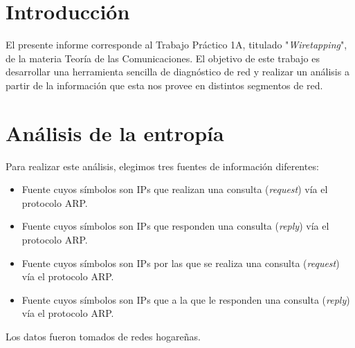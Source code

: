 \documentclass{article}
\begin{document}





\maketitle


\tableofcontents

\newpage

\section{Introducción}
El presente informe corresponde al Trabajo Práctico 1A, titulado
"\emph{Wiretapping}", de la materia Teoría de las Comunicaciones. El objetivo
de este trabajo es desarrollar una herramienta sencilla de diagnóstico de red
y realizar un análisis a partir de la información que esta nos provee en
distintos segmentos de red.

\section{Análisis de la entropía}
Para realizar este análisis, elegimos tres fuentes de información diferentes:

\begin{itemize}
    \item Fuente cuyos símbolos son IPs que realizan una consulta
        (\emph{request}) vía el protocolo ARP.
    \item Fuente cuyos símbolos son IPs que responden una consulta
        (\emph{reply}) vía el protocolo ARP.
    \item Fuente cuyos símbolos son IPs por las que se realiza una consulta
        (\emph{request}) vía el protocolo ARP.
    \item Fuente cuyos símbolos son IPs que a la que le responden una consulta
        (\emph{reply}) vía el protocolo ARP.
\end{itemize}

Los datos fueron tomados de redes hogareñas.
\end{document}
